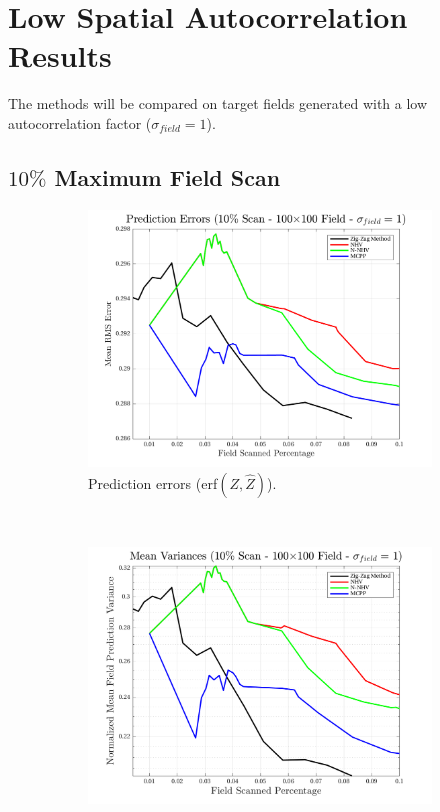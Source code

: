 
\section{Low Spatial Autocorrelation Results}
The methods will be compared on target fields generated with a low autocorrelation factor ($\sigma_{field}=1$).

\clearpage
\subsection{$10\%$ Maximum Field Scan}
\begin{figure}[htb!]
    \centering
    \begin{subfigure}[t]{0.65\textwidth}
        \centering
        \includegraphics[width=\linewidth]{figures/hbresults/pred_errs_10p_100x100_sf_1_seed_2.png}
        \captionsetup{skip=0.20\baselineskip,size=footnotesize}
        \caption{Prediction errors (erf$(Z,\hat{Z})$).}
        \label{fig:prederrs_sigma1_p10_s2}
    \end{subfigure}%
    \\
    \begin{subfigure}[t]{0.65\textwidth}
        \centering
        \includegraphics[width=\linewidth]{figures/hbresults/vars_10p_100x100_sf_1_seed_2.png}

\end{subfigure}
\end{figure}
